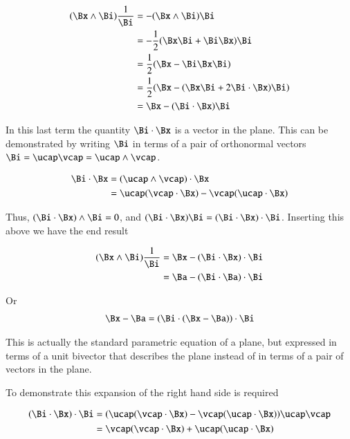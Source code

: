 \begin{align*}
(\Bx \wedge \Bi)\frac{1}{\Bi} 
&= -(\Bx \wedge \Bi){\Bi} \\ 
&= -\frac{1}{2}(\Bx\Bi + \Bi\Bx){\Bi} \\ 
&= \frac{1}{2}(\Bx - \Bi\Bx\Bi) \\ 
&= \frac{1}{2}(\Bx - (\Bx \Bi + 2 \Bi \cdot \Bx)\Bi) \\ 
&= \Bx - (\Bi \cdot \Bx)\Bi \\ 
\end{align*}

In this last term the quantity $\Bi \cdot \Bx$ is a vector in the plane.
This can be demonstrated by writing $\Bi$ in terms of a pair of orthonormal
vectors $\Bi = \ucap\vcap = \ucap \wedge \vcap$.

\begin{align*}
\Bi \cdot \Bx &= (\ucap \wedge \vcap) \cdot \Bx \\
              &= \ucap (\vcap \cdot \Bx) - \vcap (\ucap \cdot \Bx) \\
\end{align*}

Thus, $(\Bi \cdot \Bx) \wedge \Bi = 0$, 
and $(\Bi \cdot \Bx) \Bi = (\Bi \cdot \Bx) \cdot \Bi$.  Inserting this above
we have the end result

\begin{align*}
(\Bx \wedge \Bi)\frac{1}{\Bi} 
&= \Bx - (\Bi \cdot \Bx) \cdot \Bi \\ 
&= \Ba - (\Bi \cdot \Ba) \cdot \Bi \\ 
\end{align*}

Or
\begin{align*}
\Bx  - \Ba 
&= (\Bi \cdot (\Bx - \Ba)) \cdot \Bi \\ 
\end{align*}

This is actually the standard parametric equation of a plane, but expressed
in terms of a unit bivector that describes the plane instead of in terms
of a pair of vectors in the plane.

To demonstrate this expansion of the right hand side is required

\begin{align*}
(\Bi \cdot \Bx) \cdot \Bi
&= (\ucap (\vcap \cdot \Bx) - \vcap (\ucap \cdot \Bx)) \ucap \vcap \\
&= \vcap (\vcap \cdot \Bx) + \ucap (\ucap \cdot \Bx) \\
\end{align*}

